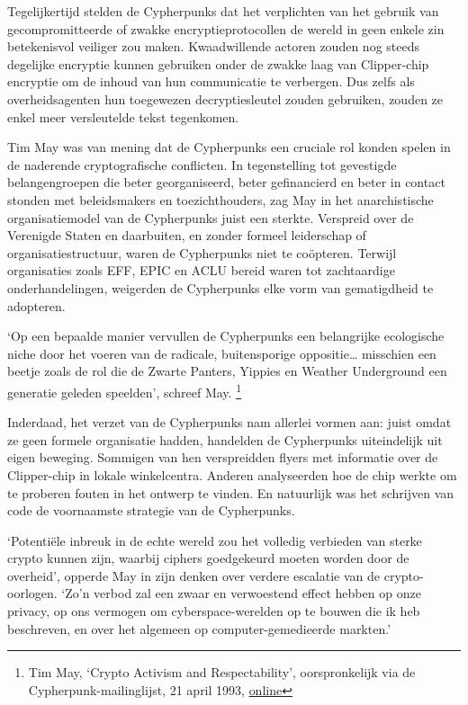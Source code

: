 \documentclass[
  a5paper,
  smalldemyvopaper,11pt,twoside,onecolumn,openright,extrafontsizes]{memoir}
\begin{document}
Tegelijkertijd stelden de Cypherpunks dat het verplichten van het
gebruik van gecompromitteerde of zwakke encryptieprotocollen de wereld
in geen enkele zin betekenisvol veiliger zou maken. Kwaadwillende
actoren zouden nog steeds degelijke encryptie kunnen gebruiken onder de
zwakke laag van Clipper-chip encryptie om de inhoud van hun communicatie
te verbergen. Dus zelfs als overheidsagenten hun toegewezen
decryptiesleutel zouden gebruiken, zouden ze enkel meer versleutelde
tekst tegenkomen.

Tim May was van mening dat de Cypherpunks een cruciale rol konden spelen
in de naderende cryptografische conflicten. In tegenstelling tot
gevestigde belangengroepen die beter georganiseerd, beter gefinancierd
en beter in contact stonden met beleidsmakers en toezichthouders, zag
May in het anarchistische organisatiemodel van de Cypherpunks juist een
sterkte. Verspreid over de Verenigde Staten en daarbuiten, en zonder
formeel leiderschap of organisatiestructuur, waren de Cypherpunks niet
te coöpteren. Terwijl organisaties zoals EFF, EPIC en ACLU bereid waren
tot zachtaardige onderhandelingen, weigerden de Cypherpunks elke vorm
van gematigdheid te adopteren.

`Op een bepaalde manier vervullen de Cypherpunks een belangrijke
ecologische niche door het voeren van de radicale, buitensporige
oppositie\ldots{} misschien een beetje zoals de rol die de Zwarte
Panters, Yippies en Weather Underground een generatie geleden speelden',
schreef May. \footnote{Tim May, `Crypto Activism and Respectability',
  oorspronkelijk via de Cypherpunk-mailinglijst, 21 april 1993,
  \href{https://cypherpunks.venona.com/date/1993/04/msg00400.html}{online}}

Inderdaad, het verzet van de Cypherpunks nam allerlei vormen aan: juist
omdat ze geen formele organisatie hadden, handelden de Cypherpunks
uiteindelijk uit eigen beweging. Sommigen van hen verspreidden flyers
met informatie over de Clipper-chip in lokale winkelcentra. Anderen
analyseerden hoe de chip werkte om te proberen fouten in het ontwerp te
vinden. En natuurlijk was het schrijven van code de voornaamste
strategie van de Cypherpunks.

`Potentiële inbreuk in de echte wereld zou het volledig verbieden van
sterke crypto kunnen zijn, waarbij ciphers goedgekeurd moeten worden
door de overheid', opperde May in zijn denken over verdere escalatie van
de crypto-oorlogen. `Zo'n verbod zal een zwaar en verwoestend effect
hebben op onze privacy, op ons vermogen om cyberspace-werelden op te
bouwen die ik heb beschreven, en over het algemeen op
computer-gemedieerde markten.'
\end{document}
